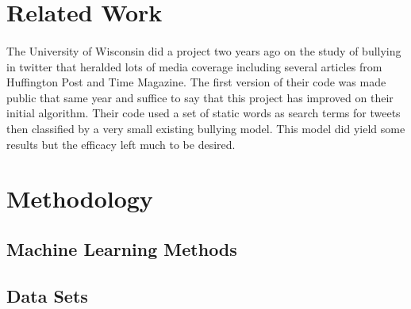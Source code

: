 \documentclass[11pt,letterpaper]{article}
\begin{document}
\section{Related Work}
\paragraph{}
The University of Wisconsin did a project two years ago on the study of bullying in twitter that heralded lots of media coverage including several articles from Huffington Post and Time Magazine. The first version of their code was made public that same year and suffice to say that this project has improved on their initial algorithm. Their code used a set of static words as search terms for tweets then classified by a very small existing bullying model. This model did yield some results but the efficacy left much to be desired.

\paragraph{}

\paragraph{}



\section{Methodology}

\subsection{Machine Learning Methods}
\subsection{Data Sets}
\end{document}
